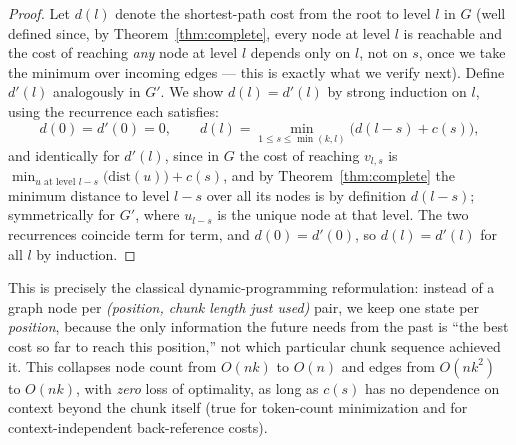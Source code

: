 \documentclass[11pt]{article}
\begin{document}
\begin{proof}
Let $d(l)$ denote the shortest-path cost from the root to level $l$ in $G$ (well
defined since, by Theorem~\ref{thm:complete}, every node at level $l$ is reachable and
the cost of reaching \emph{any} node at level $l$ depends only on $l$, not on $s$, once
we take the minimum over incoming edges — this is exactly what we verify next). Define
$d'(l)$ analogously in $G'$. We show $d(l) = d'(l)$ by strong induction on $l$, using the
recurrence each satisfies:
\[
  d(0) = d'(0) = 0, \qquad
  d(l) = \min_{1 \le s \le \min(k,l)} \big( d(l-s) + c(s) \big),
\]
and identically for $d'(l)$, since in $G$ the cost of reaching $v_{l,s}$ is
$\min_{u \text{ at level } l-s} \big(\text{dist}(u)\big) + c(s)$, and by
Theorem~\ref{thm:complete} the minimum distance to level $l-s$ over all its nodes is by
definition $d(l-s)$; symmetrically for $G'$, where $u_{l-s}$ is the unique node at that
level. The two recurrences coincide term for term, and $d(0)=d'(0)$, so $d(l) = d'(l)$
for all $l$ by induction.
\end{proof}

This is precisely the classical dynamic-programming reformulation: instead of a graph
node per \emph{(position, chunk length just used)} pair, we keep one state per
\emph{position}, because the only information the future needs from the past is ``the
best cost so far to reach this position,'' not which particular chunk sequence achieved
it. This collapses node count from $O(nk)$ to $O(n)$ and edges from $O(nk^2)$ to
$O(nk)$, with \emph{zero} loss of optimality, as long as $c(s)$ has no dependence on
context beyond the chunk itself (true for token-count minimization and for
context-independent back-reference costs).
\end{document}
